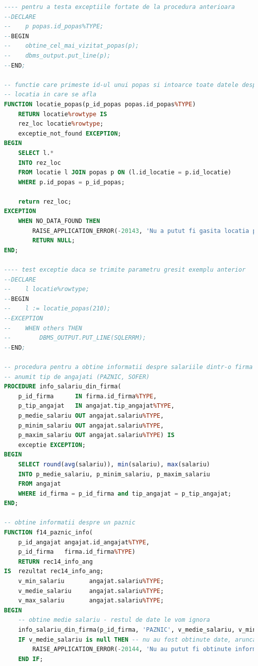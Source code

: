 \documentclass[12pt, a4paper]{article}
\begin{document}
\begin{lstlisting}[language=SQL]
---- pentru a testa exceptiile fortate de la procedura anterioara
--DECLARE
--    p popas.id_popas%TYPE;
--BEGIN
--    obtine_cel_mai_vizitat_popas(p);
--    dbms_output.put_line(p);
--END;

-- functie care primeste id-ul unui popas si intoarce toate datele despre
-- locatia in care se afla
FUNCTION locatie_popas(p_id_popas popas.id_popas%TYPE)
    RETURN locatie%rowtype IS
    rez_loc locatie%rowtype;
    exceptie_not_found EXCEPTION;
BEGIN
    SELECT l.*
    INTO rez_loc
    FROM locatie l JOIN popas p ON (l.id_locatie = p.id_locatie)
    WHERE p.id_popas = p_id_popas;
    
    return rez_loc;
EXCEPTION
    WHEN NO_DATA_FOUND THEN
        RAISE_APPLICATION_ERROR(-20143, 'Nu a putut fi gasita locatia popasului.');
        RETURN NULL;
END;

---- test exceptie daca se trimite parametru gresit exemplu anterior
--DECLARE
--    l locatie%rowtype;
--BEGIN
--    l := locatie_popas(210);
--EXCEPTION
--    WHEN others THEN
--        DBMS_OUTPUT.PUT_LINE(SQLERRM);
--END;

-- procedura pentru a obtine informatii despre salariile dintr-o firma pentru un
-- anumit tip de angajati (PAZNIC, SOFER)
PROCEDURE info_salariu_din_firma(
    p_id_firma      IN firma.id_firma%TYPE,
    p_tip_angajat   IN angajat.tip_angajat%TYPE,
    p_medie_salariu OUT angajat.salariu%TYPE,
    p_minim_salariu OUT angajat.salariu%TYPE,
    p_maxim_salariu OUT angajat.salariu%TYPE) IS
    exceptie EXCEPTION;
BEGIN
    SELECT round(avg(salariu)), min(salariu), max(salariu)
    INTO p_medie_salariu, p_minim_salariu, p_maxim_salariu
    FROM angajat
    WHERE id_firma = p_id_firma and tip_angajat = p_tip_angajat;
END;

-- obtine informatii despre un paznic
FUNCTION f14_paznic_info(
    p_id_angajat angajat.id_angajat%TYPE,
    p_id_firma   firma.id_firma%TYPE)
    RETURN rec14_info_ang
IS  rezultat rec14_info_ang;
    v_min_salariu       angajat.salariu%TYPE;
    v_medie_salariu     angajat.salariu%TYPE;
    v_max_salariu       angajat.salariu%TYPE;
BEGIN
    -- obtine medie salariu - restul de date le vom ignora
    info_salariu_din_firma(p_id_firma, 'PAZNIC', v_medie_salariu, v_min_salariu, v_max_salariu);
    IF v_medie_salariu is null THEN -- nu au fost obtinute date, arunca exceptie
        RAISE_APPLICATION_ERROR(-20144, 'Nu au putut fi obtinute informatii despre firma');
    END IF;


\end{lstlisting}
\end{document}
